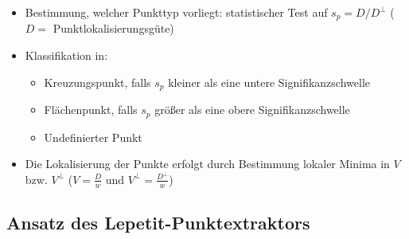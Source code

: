 \documentclass[11pt]{article}
\begin{document}
\begin{itemize}
    \item Bestimmung, welcher Punkttyp vorliegt: statistischer Test auf $s_p = D / D^{\perp}$ ($D =$ Punktlokalisierungsgüte)
    \item Klassifikation in:
        \begin{itemize}
            \item Kreuzungspunkt, falls $s_p$ kleiner als eine untere Signifikanzschwelle
            \item Flächenpunkt, falls $s_p$ größer als eine obere Signifikanzschwelle
            \item Undefinierter Punkt
        \end{itemize}
    \item Die Lokalisierung der Punkte erfolgt durch Bestimmung lokaler Minima in $V$ bzw. $V^{\perp}$ ($V = \frac{D}{w}$ und $V^{\perp} = \frac{D^{\perp}}{w}$)
\end{itemize}

\subsection{Ansatz des Lepetit-Punktextraktors}
\end{document}
